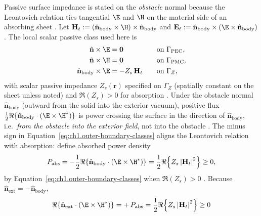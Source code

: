 Passive surface impedance is stated on the \emph{obstacle} normal because the Leontovich relation ties tangential $\E$ and $\H$ on the material side of an absorbing sheet \cite{stratton1941,harrington2001}. Let $\mathbf{H}_t:=(\hat{\mathbf{n}}_{\mathrm{body}}\times\H)\times\hat{\mathbf{n}}_{\mathrm{body}}$ and $\mathbf{E}_t:=\hat{\mathbf{n}}_{\mathrm{body}}\times(\E\times\hat{\mathbf{n}}_{\mathrm{body}})$. The local scalar passive class used here is
\begin{equation}
\label{eq:ch1.outer-boundary-classes}
\begin{aligned}
\hat{\mathbf{n}}\times\E&=\mathbf{0}\quad &&\text{on }\Gamma_{\mathrm{PEC}},\\
\hat{\mathbf{n}}\times\H&=\mathbf{0}\quad &&\text{on }\Gamma_{\mathrm{PMC}},\\
\hat{\mathbf{n}}_{\mathrm{body}}\times\E&=-Z_s\,\mathbf{H}_t
\quad &&\text{on }\Gamma_Z,
\end{aligned}
\end{equation}
with scalar passive impedance $Z_s(\mathbf{r})$ specified on $\Gamma_Z$ (spatially constant on the sheet unless noted) and $\Re(Z_s)>0$ for absorption \cite{stratton1941,harrington2001}. Under the obstacle normal $\hat{\mathbf{n}}_{\mathrm{body}}$ (outward from the solid into the exterior vacuum), positive flux $\tfrac12\Re\{\hat{\mathbf{n}}_{\mathrm{body}}\cdot(\E\times\H^*)\}$ is power crossing the surface in the direction of $\hat{\mathbf{n}}_{\mathrm{body}}$, i.e.\ \emph{from the obstacle into the exterior field}, not into the obstacle \cite{stratton1941,harrington2001}. The minus sign in Equation~\eqref{eq:ch1.outer-boundary-classes} aligns the Leontovich relation with absorption: define absorbed power density
\begin{equation}
\label{eq:ch1.impedance-boundary-power}
P_{\mathrm{abs}}
=-\frac{1}{2}\Re\!\left\{
\hat{\mathbf{n}}_{\mathrm{body}}\cdot\left(\E\times\H^*\right)
\right\}
=\frac{1}{2}\Re\!\left\{
Z_s\left|\mathbf{H}_t\right|^2
\right\}\ge 0,
\end{equation}
by Equation~\eqref{eq:ch1.outer-boundary-classes} when $\Re(Z_s)>0$ \cite{stratton1941,harrington2001}. Because $\hat{\mathbf{n}}_{\mathrm{ext}}=-\hat{\mathbf{n}}_{\mathrm{body}}$,
\begin{equation}
\label{eq:ch1.impedance-exterior-normal-flux}
\Re\!\left\{
\hat{\mathbf{n}}_{\mathrm{ext}}\cdot\left(\E\times\H^*\right)
\right\}
=+\,P_{\mathrm{abs}}
=\frac{1}{2}\Re\!\left\{
Z_s\left|\mathbf{H}_t\right|^2
\right\}\ge 0
\end{equation}
